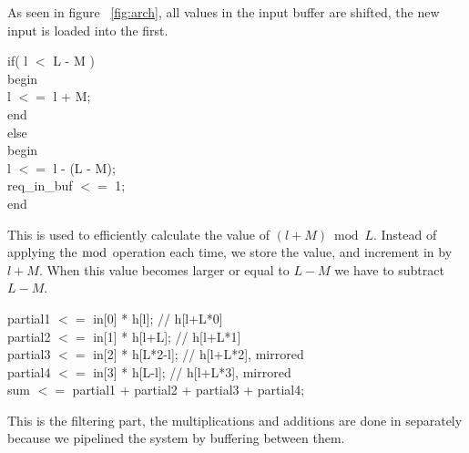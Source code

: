 As seen in figure ~\ref{fig:arch}, all values in the input buffer are shifted, the new input is loaded into the first.\\
\begin{center}
\parbox{10cm}{
if( l $<$ L - M )\\
begin\\
\phantom{xxxx} l $<=$ l + M;\\
end\\
else\\
begin\\
\phantom{xxxx}l $<=$ l - (L - M);\\
\phantom{xxxx}req\_in\_buf $<=$ 1;\\
end\\
}
\end{center}
This is used to efficiently calculate the value of $(l + M) \bmod L$. Instead of applying the $\bmod$ operation each time, we store the value, and increment in by $l + M$. When this value becomes larger or equal to  $L - M$ we have to subtract $L - M$.\\
\begin{center}
\parbox{10cm}{
partial1 $<=$ in[0] * h[l];      // h[l+L*0] \\
partial2 $<=$ in[1] * h[l+L];    // h[l+L*1]\\
partial3 $<=$ in[2] * h[L*2-l];  // h[l+L*2], mirrored\\
partial4 $<=$ in[3] * h[L-l];    // h[l+L*3], mirrored\\
sum $<=$ partial1 + partial2 + partial3 + partial4;\\
}
\end{center}
This is the filtering part, the multiplications and additions are done in separately because we pipelined the system by buffering between them.

\FloatBarrier
